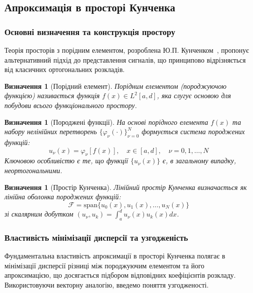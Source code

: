 \documentclass[12pt,a4paper]{article}
\newtheorem{definition}[theorem]{Визначення}
\begin{document}
\subsection{Апроксимація в просторі Кунченка}

\subsubsection{Основні визначення та конструкція простору}

Теорія просторів з порідним елементом, розроблена Ю.П. Кунченком~\cite{kunchenko2003polynomial}, пропонує альтернативний підхід до представлення сигналів, що принципово відрізняється від класичних ортогональних розкладів.

\begin{definition}[Порідний елемент]
	Порідним елементом (породжуючою функцією) називається функція $f(x) \in L^2[a,d]$, яка слугує основою для побудови всього функціонального простору.
\end{definition}

\begin{definition}[Породжені функції]
	На основі порідного елемента $f(x)$ та набору нелінійних перетворень $\{\varphi_\nu(\cdot)\}_{\nu=0}^N$ формується система породжених функцій:
	\begin{equation}
		u_\nu(x) = \varphi_\nu[f(x)], \quad x \in [a,d], \quad \nu = 0, 1, \ldots, N
	\end{equation}
	Ключовою особливістю є те, що функції $\{u_\nu(x)\}$ є, в загальному випадку, неортогональними.
\end{definition}

\begin{definition}[Простір Кунченка]
	Лінійний простір Кунченка визначається як лінійна оболонка породжених функцій:
	\begin{equation}
		\mathcal{F} = \text{span}\{u_0(x), u_1(x), \ldots, u_N(x)\}
	\end{equation}
	зі скалярним добутком $(u_\nu, u_k) = \int_a^d u_\nu(x) u_k(x) dx$.
\end{definition}

\subsubsection{Властивість мінімізації дисперсії та узгодженість}

Фундаментальна властивість апроксимації в просторі Кунченка полягає в мінімізації дисперсії різниці між породжуючим елементом та його апроксимацією, що досягається підбором відповідних коефіцієнтів розкладу. Використовуючи векторну аналогію, введемо поняття узгодженості.
\end{document}
